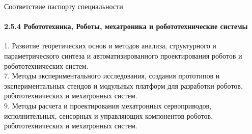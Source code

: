 \documentclass[aspectratio=169,xcolor=table,10pt]{beamer}
\newcommand{\fbckg}[1]{\usebackgroundtemplate{\texttt{[image: \#1]}}}%
\begin{document}
\begin{frame}[t]{Соответствие паспорту специальности}
    \framesubtitle{2.5.4 Робототехника, Роботы, мехатроника и
    робототехнические системы}
    1. Развитие теоретических основ и методов анализа, структурного и параметрического синтеза и автоматизированного проектирования роботов и робототехнических систем. \\
    7. Методы экспериментального исследования, создания прототипов и
    экспериментальных стендов и модульных платформ для разработки роботов, робототехнических и мехатронных систем. \\
    9. Методы расчета и проектирования мехатронных сервоприводов,
    исполнительных, сенсорных и управляющих компонентов роботов,
    робототехнических и мехатронных систем.
\end{frame}


\fbckg{fibeamer/figs/last_page.png}
\frame[plain]{}
\fbckg{fibeamer/figs/common.png}
\end{document}
